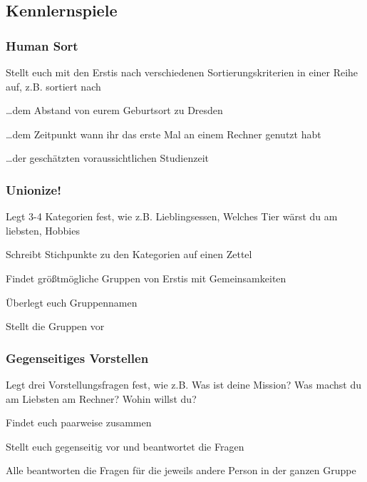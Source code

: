 \documentclass[a4paper,12pt]{scrreprt}
\begin{document}
\subsection{Kennlernspiele}

\subsubsection{Human Sort}
\begin{itemize*}
    \item Stellt euch mit den Erstis nach verschiedenen Sortierungskriterien in einer Reihe auf, z.B. sortiert nach
    \item \dots dem Abstand von eurem Geburtsort zu Dresden
    \item \dots dem Zeitpunkt wann ihr das erste Mal an einem Rechner genutzt habt
    \item \dots der geschätzten voraussichtlichen Studienzeit
\end{itemize*}

\subsubsection{Unionize!}
\begin{itemize*}
    \item Legt 3-4 Kategorien fest, wie z.B. Lieblingsessen, Welches Tier wärst du am liebsten, Hobbies
    \item Schreibt Stichpunkte zu den Kategorien auf einen Zettel
    \item Findet größtmögliche Gruppen von Erstis mit Gemeinsamkeiten
    \item Überlegt euch Gruppennamen
    \item Stellt die Gruppen vor
\end{itemize*}

\subsubsection{Gegenseitiges Vorstellen}
\begin{itemize*}
    \item Legt drei Vorstellungsfragen fest, wie z.B. Was ist deine Mission? Was machst du am Liebsten am Rechner? Wohin willst du?
    \item Findet euch paarweise zusammen
    \item Stellt euch gegenseitig vor und beantwortet die Fragen
    \item Alle beantworten die Fragen für die jeweils andere Person in der ganzen Gruppe
\end{itemize*}
\end{document}
